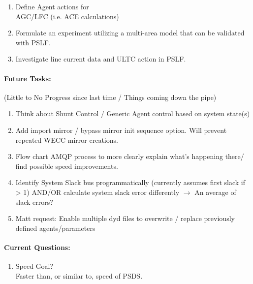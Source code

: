 \documentclass[12pt]{article}
\begin{document}
\begin{multicols}{2}
\begin{enumerate}
		\item Define Agent actions for \\ AGC/LFC (i.e. ACE calculations)

		\item Formulate an experiment utilizing a multi-area model that can be validated with PSLF.

		\item Investigate line current data and ULTC action in PSLF.

		
		

	\end{enumerate}
\vfill\null
\columnbreak

\paragraph{Future Tasks:}(Little to No Progress since last time / Things coming down the pipe)
	\begin{enumerate}
		\item Think about Shunt Control / Generic Agent control based on system state(s)
		\item Add import mirror / bypass mirror init sequence option. Will prevent repeated WECC mirror creations.
		
		\item Flow chart AMQP process to more clearly explain what's happening there/ find possible speed improvements.

		\item Identify System Slack bus programmatically (currently assumes first slack if > 1)
		\subitem AND/OR calculate system slack error differently $\rightarrow$ An average of slack errors?

		\item Matt request: Enable multiple dyd files to overwrite / replace previously defined agents/parameters
		
		
	\end{enumerate}
	\paragraph{Current Questions:}
	\begin{enumerate}
	 	\item Speed Goal? \\
	 	Faster than, or similar to, speed of PSDS.
		

\end{enumerate}
\end{multicols}
\end{document}

